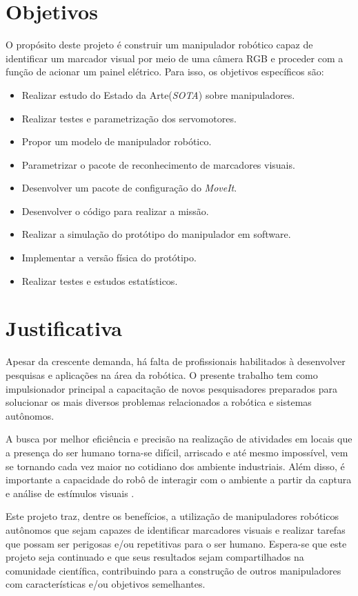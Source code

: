 \section{Objetivos}
\label{sec:obj}
O propósito deste projeto é construir um manipulador robótico capaz de identificar um marcador visual por meio de uma câmera RGB e proceder com a função de acionar um painel elétrico. 
Para isso, os objetivos específicos são:
\begin{itemize}
  \item  Realizar estudo do Estado da Arte(\textit{\acs{SOTA}}) sobre manipuladores.
  \item  Realizar testes e parametrização dos servomotores.
  \item  Propor um modelo de manipulador robótico.
  \item  Parametrizar o pacote de reconhecimento de marcadores visuais. 
  \item  Desenvolver um pacote de configuração do \textit{MoveIt}.
  \item  Desenvolver o código para realizar a missão. 
  \item  Realizar a simulação do protótipo do manipulador em software.   
  \item  Implementar a versão física do protótipo.
  \item  Realizar testes e estudos estatísticos.
\end{itemize} 
\section{Justificativa} %
\label{sec:just}

  Apesar da crescente demanda, há falta de profissionais habilitados à desenvolver pesquisas e aplicações na área da robótica. O presente trabalho tem como impulsionador principal a capacitação de novos pesquisadores preparados para solucionar os mais diversos problemas relacionados a robótica e sistemas autônomos.

  A busca por melhor eficiência e precisão na realização de atividades em locais que a presença do ser humano torna-se difícil, arriscado e até mesmo impossível, vem se tornando cada vez maior no cotidiano dos ambiente industriais. Além disso, é importante a capacidade do robô de interagir com o ambiente a partir da captura e análise de estímulos visuais \cite{leite2005controle}. 

  Este projeto traz, dentre os benefícios, a utilização  de manipuladores robóticos autônomos que sejam capazes de identificar marcadores visuais e realizar tarefas que possam ser perigosas e/ou repetitivas para o ser humano. Espera-se que este projeto seja continuado e que seus resultados sejam compartilhados na comunidade científica, contribuindo para a construção de outros manipuladores com características e/ou objetivos semelhantes.
  



